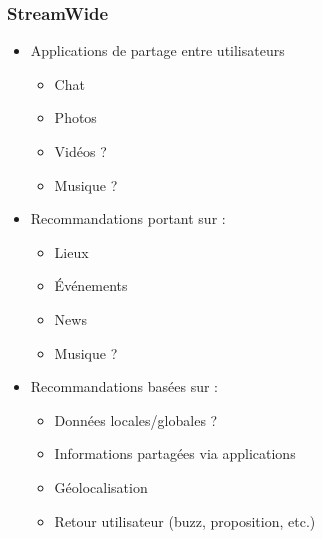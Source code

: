 \documentclass[a4,11pt,sans]{beamer}
\begin{document}
\begin{frame}
        \frametitle{StreamWide}

        \begin{itemize}
            \item Applications de partage entre utilisateurs
                \begin{itemize}
                    \item Chat
                    \item Photos
                    \item Vid\'eos ?
                    \item Musique ?
                \end{itemize}
            \item Recommandations portant sur :
                \begin{itemize}
                    \item Lieux
                    \item \'Ev\'enements
                    \item News
                    \item Musique ?
                \end{itemize}
            \item Recommandations bas\'ees sur :
                \begin{itemize}
                    \item Donn\'ees locales/globales ?
                    \item Informations partag\'ees via applications
                    \item G\'eolocalisation
                    \item Retour utilisateur (buzz, proposition, etc.)
                \end{itemize}
        \end{itemize}
    \end{frame}
\end{document}
